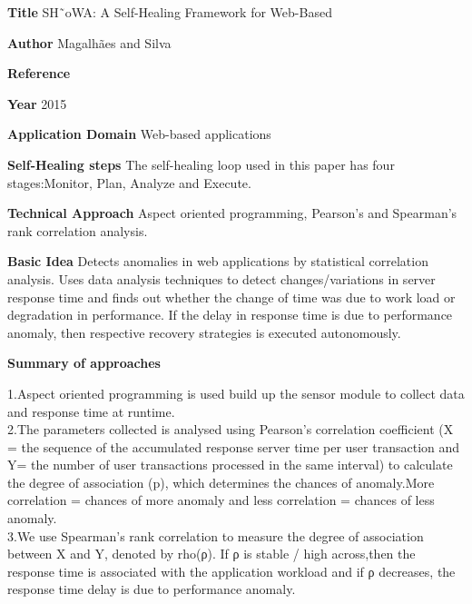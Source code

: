 \begin{compactitem}
\item[\textbf{Title}]SH˜oWA: A Self-Healing Framework for Web-Based

\item[\textbf{Author}]Magalhães and Silva 

\item[\textbf{Reference}]

\cite{magalhaes_showa:_2015}

\item[\textbf{Year}] 2015

\item[\textbf{Application Domain}]
Web-based applications 

\item[\textbf{Self-Healing steps}] 
The self-healing loop used in this paper has four stages:Monitor, Plan, Analyze and Execute.

\item[\textbf{Technical Approach}]Aspect oriented programming, Pearson's and Spearman's rank correlation analysis.

\item[\textbf{Basic Idea}] 
Detects anomalies in web applications by statistical correlation analysis. Uses data analysis techniques to detect changes/variations in server response time and finds out whether the change of time was due to work load or degradation in performance. If the delay in response time is due to performance anomaly, then respective recovery strategies is executed autonomously.

\item[\textbf{Summary of approaches}] 

1.Aspect oriented programming is used build up the sensor module to collect data and response time at runtime.\\

2.The parameters collected is analysed using Pearson's correlation coefficient (X = the sequence of the accumulated response server time per user transaction and Y= the number of user transactions processed in the same interval) to calculate the degree of association (p), which determines  the chances of anomaly.More correlation = chances of more anomaly and less correlation = chances of less anomaly.\\

3.We use Spearman's rank correlation to measure the degree of association between X and Y, denoted by rho(ρ). If ρ is stable / high across,then the response time is associated with the application workload and if ρ decreases, the response time delay is due to performance anomaly.\\


\end{compactitem}
